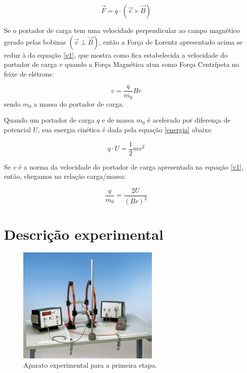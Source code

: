 \documentclass{article}
\begin{document}
\begin{equation}
    \vec F  = q \cdot ( \vec v \times \vec B)
\end{equation}

Se o portador de carga tem uma velocidade perpendicular ao campo magnético gerado pelas bobinas $(\vec v \perp \vec B)$, então a Força de Lorentz apresentado acima se reduz à da equação \ref{v1}, que mostra como fica estabelecida a velocidade do portador de carga $v$ quando a Força Magnética atua como Força Centrípeta no feixe de elétrons:

\begin{equation}
    \label{v1}
    v= \frac{q}{m _0}Br
\end{equation}
sendo $m _0$ a massa do portador de carga.

Quando um portador de carga $q$ e de massa $m _0$ é acelerado por diferença de potencial $U$, sua energia cinética é dada pela equação \ref{energia} abaixo

\begin{equation}
    \label{energia}
    q \cdot U = \frac{1}{2} mv^2
\end{equation}

Se $v$ é a norma da velocidade do portador de carga apresentada na equação \ref{v1}, então, chegamos na relação carga/massa:

\begin{equation}
    \label{qm}
    \frac{q}{m _0}= \frac{2U}{(Br)^2}
\end{equation}

\section{Descrição experimental}

\begin{figure}
    \centering
    \includegraphics[width=7cm]{Imagens/Experimento 2.1.png}
    \caption{Aparato experimental para a primeira etapa.}
    \label{1etapa}
\end{figure}
\end{document}
